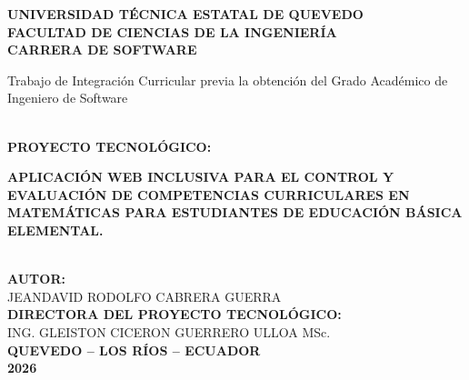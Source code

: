 \thispagestyle{empty}

\begin{center}
    \vspace*{0.5cm}
    {\bfseries\large UNIVERSIDAD TÉCNICA ESTATAL DE QUEVEDO}\\[0.4cm]
    {\bfseries\large FACULTAD DE CIENCIAS DE LA INGENIERÍA}\\[0.4cm]
    {\bfseries\large CARRERA DE SOFTWARE}\\[2cm]

    \begin{minipage}{0.75\textwidth}
        \centering
        \onehalfspacing
        Trabajo de Integración Curricular previa la obtención del Grado Académico de Ingeniero de Software
    \end{minipage}\\[1.8cm]

    {\bfseries PROYECTO TECNOLÓGICO:}\\[0.6cm]
    \begin{minipage}{0.85\textwidth}
        \centering
        \bfseries
        APLICACIÓN WEB INCLUSIVA PARA EL CONTROL Y EVALUACIÓN DE COMPETENCIAS CURRICULARES EN MATEMÁTICAS PARA ESTUDIANTES DE EDUCACIÓN BÁSICA ELEMENTAL.
    \end{minipage}\\[1.8cm]

    {\bfseries AUTOR:}\\[0.3cm]
    JEANDAVID RODOLFO CABRERA GUERRA\\[1.2cm]

    {\bfseries DIRECTORA DEL PROYECTO TECNOLÓGICO:}\\[0.3cm]
    ING. GLEISTON CICERON GUERRERO ULLOA MSc.\\[2cm]

    {\bfseries QUEVEDO -- LOS RÍOS -- ECUADOR}\\[0.4cm]
    {\bfseries 2026}
\end{center}

\newpage
